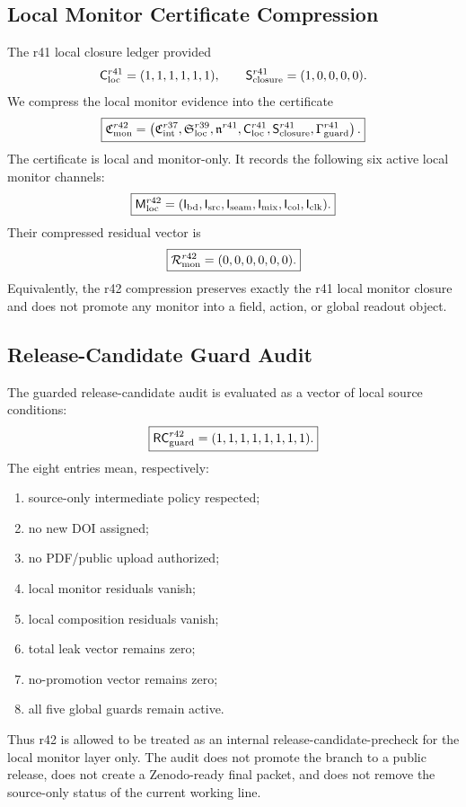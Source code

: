 \subsection{Local Monitor Certificate Compression}
\label{subsec:r42-local-monitor-certificate-compression}

The r41 local closure ledger provided
\[
\mathsf C_{\rm loc}^{r41}=(1,1,1,1,1,1),
\qquad
\mathsf S_{\rm closure}^{r41}=(1,0,0,0,0).
\]
We compress the local monitor evidence into the certificate
\[
\boxed{
\mathfrak C_{\rm mon}^{r42}
=
\left(
\mathfrak C_{\rm int}^{r37},
\mathfrak S_{\rm loc}^{r39},
\mathfrak n^{r41},
\mathsf C_{\rm loc}^{r41},
\mathsf S_{\rm closure}^{r41},
\Gamma_{\rm guard}^{r41}
\right).
}
\]
The certificate is local and monitor-only.  It records the following
six active local monitor channels:
\[
\boxed{
\mathsf M_{\rm loc}^{r42}
=
(\mathsf I_{\rm bd},\mathsf I_{\rm src},\mathsf I_{\rm seam},
 \mathsf I_{\rm mix},\mathsf I_{\rm col},\mathsf I_{\rm clk}).
}
\]
Their compressed residual vector is
\[
\boxed{
\mathcal R_{\rm mon}^{r42}=(0,0,0,0,0,0).
}
\]
Equivalently, the r42 compression preserves exactly the r41 local monitor
closure and does not promote any monitor into a field, action, or global
readout object.

\subsection{Release-Candidate Guard Audit}
\label{subsec:r42-release-candidate-guard-audit}

The guarded release-candidate audit is evaluated as a vector of local source
conditions:
\[
\boxed{
\mathsf{RC}_{\rm guard}^{r42}
=
(1,1,1,1,1,1,1,1).
}
\]
The eight entries mean, respectively:
\begin{enumerate}[label=\textnormal{RC\arabic*.},leftmargin=2.3em]
  \item source-only intermediate policy respected;
  \item no new DOI assigned;
  \item no PDF/public upload authorized;
  \item local monitor residuals vanish;
  \item local composition residuals vanish;
  \item total leak vector remains zero;
  \item no-promotion vector remains zero;
  \item all five global guards remain active.
\end{enumerate}
Thus r42 is allowed to be treated as an internal release-candidate-precheck
for the local monitor layer only.  The audit does not promote the branch to a
public release, does not create a Zenodo-ready final packet, and does not
remove the source-only status of the current working line.

